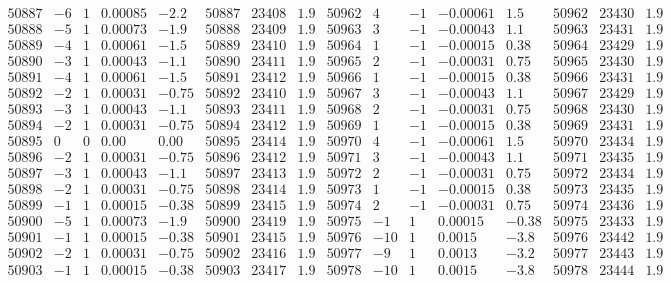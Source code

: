 \documentclass[11pt,reqno,a4letter]{article}
\numberwithin{figure}{section}
\numberwithin{table}{section}
\theoremstyle{plain}
\numberwithin{theorem}{section}
\theoremstyle{definition}
\begin{document}
\begin{table}[ht]
\begin{equation*}
{\begin{array}{ccccc|ccc||ccccc|ccc}
50887 & -6 & 1 & 0.00085 & -2.2 & 50887 & 23408 & 1.9 & 50962 & 4 & -1 & -0.00061 & 1.5 & 50962 & 23430 & 1.9  \\
50888 & -5 & 1 & 0.00073 & -1.9 & 50888 & 23409 & 1.9 & 50963 & 3 & -1 & -0.00043 & 1.1 & 50963 & 23431 & 1.9  \\
50889 & -4 & 1 & 0.00061 & -1.5 & 50889 & 23410 & 1.9 & 50964 & 1 & -1 & -0.00015 & 0.38 & 50964 & 23429 & 1.9  \\
50890 & -3 & 1 & 0.00043 & -1.1 & 50890 & 23411 & 1.9 & 50965 & 2 & -1 & -0.00031 & 0.75 & 50965 & 23430 & 1.9  \\
50891 & -4 & 1 & 0.00061 & -1.5 & 50891 & 23412 & 1.9 & 50966 & 1 & -1 & -0.00015 & 0.38 & 50966 & 23431 & 1.9  \\
50892 & -2 & 1 & 0.00031 & -0.75 & 50892 & 23410 & 1.9 & 50967 & 3 & -1 & -0.00043 & 1.1 & 50967 & 23429 & 1.9  \\
50893 & -3 & 1 & 0.00043 & -1.1 & 50893 & 23411 & 1.9 & 50968 & 2 & -1 & -0.00031 & 0.75 & 50968 & 23430 & 1.9  \\
50894 & -2 & 1 & 0.00031 & -0.75 & 50894 & 23412 & 1.9 & 50969 & 1 & -1 & -0.00015 & 0.38 & 50969 & 23431 & 1.9  \\
50895 & 0 & 0 & 0.00 & 0.00 & 50895 & 23414 & 1.9 & 50970 & 4 & -1 & -0.00061 & 1.5 & 50970 & 23434 & 1.9  \\
50896 & -2 & 1 & 0.00031 & -0.75 & 50896 & 23412 & 1.9 & 50971 & 3 & -1 & -0.00043 & 1.1 & 50971 & 23435 & 1.9  \\
50897 & -3 & 1 & 0.00043 & -1.1 & 50897 & 23413 & 1.9 & 50972 & 2 & -1 & -0.00031 & 0.75 & 50972 & 23434 & 1.9  \\
50898 & -2 & 1 & 0.00031 & -0.75 & 50898 & 23414 & 1.9 & 50973 & 1 & -1 & -0.00015 & 0.38 & 50973 & 23435 & 1.9  \\
50899 & -1 & 1 & 0.00015 & -0.38 & 50899 & 23415 & 1.9 & 50974 & 2 & -1 & -0.00031 & 0.75 & 50974 & 23436 & 1.9  \\
50900 & -5 & 1 & 0.00073 & -1.9 & 50900 & 23419 & 1.9 & 50975 & -1 & 1 & 0.00015 & -0.38 & 50975 & 23433 & 1.9  \\
50901 & -1 & 1 & 0.00015 & -0.38 & 50901 & 23415 & 1.9 & 50976 & -10 & 1 & 0.0015 & -3.8 & 50976 & 23442 & 1.9  \\
50902 & -2 & 1 & 0.00031 & -0.75 & 50902 & 23416 & 1.9 & 50977 & -9 & 1 & 0.0013 & -3.2 & 50977 & 23443 & 1.9  \\
50903 & -1 & 1 & 0.00015 & -0.38 & 50903 & 23417 & 1.9 & 50978 & -10 & 1 & 0.0015 & -3.8 & 50978 & 23444 & 1.9  \\

\end{array}}
\end{equation*}
\end{table}
\end{document}
